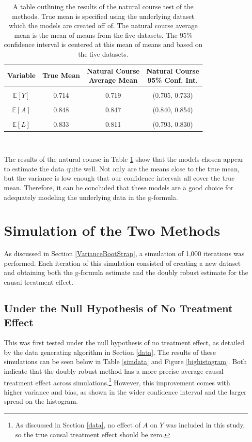 \begin{table}[h!]
\centering
\begin{tabular}{c | c c c}
Variable & True Mean & \shortstack{Natural Course\\ Average Mean} & \shortstack{Natural Course \\95\% Conf. Int.} \\ 
\hline \\
$\mathbb{E}[Y]$ & 0.714 & 0.719 & (0.705, 0.733) \\ \\
$\mathbb{E}[A]$ & 0.848 & 0.847 & (0.840, 0.854) \\ \\
$\mathbb{E}[L]$ & 0.833 & 0.811 & (0.793, 0.830) 
\end{tabular} \\
\centering
\caption{A table outlining the results of the natural course test of the methods.  True mean is specified using the underlying dataset which the models are created off of.  The natural course average mean is the mean of means from the five datasets.  The 95\% confidence interval is centered at this mean of means and based on the five datasets. \label{naturalcourse}}
\end{table}

The results of the natural course in Table \ref{naturalcourse} show that the models chosen appear to estimate the data quite well.  Not only are the means close to the true mean, but the variance is low enough that our confidence intervals all cover the true mean.  Therefore, it can be concluded that these models are a good choice for adequately modeling the underlying data in the g-formula.  

\section{Simulation of the Two Methods} 
As discussed in Section \ref{VarianceBootStrap}, a simulation of 1,000 iterations was performed.  Each iteration of this simulation consisted of creating a new dataset and obtaining both the g-formula estimate and the doubly robust estimate for the causal treatment effect.  

\subsection{Under the Null Hypothesis of No Treatment Effect} 
This was first tested under the null hypothesis of no treatment effect, as detailed by the data generating algorithm in Section \ref{data}.  The results of these simulations can be seen below in Table \ref{simdata} and Figure \ref{bighistogram}.  Both indicate that the doubly robust method has a more precise average causal treatment effect across simulations.\footnote{As discussed in Section \ref{data}, no effect of $A$ on $Y$ was included in this study, so the true causal treatment effect should be zero.}  However, this improvement comes with higher variance and bias, as shown in the wider confidence interval and the larger spread on the histogram.  

